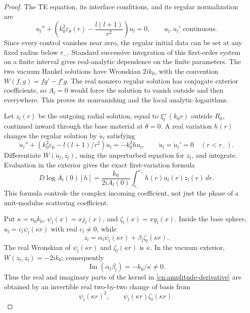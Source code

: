 \begin{proof}
The TE equation, its interface conditions, and its regular normalization
are
\begin{equation}\label{cn:controlled-ode}
 u_l''+\left(k_0^2\varepsilon_\theta(r)
                 -\frac{l(l+1)}{r^2}\right)u_l=0,
 \qquad u_l,u_l'\text{ continuous}.
\end{equation}
Since every control vanishes near zero, the regular initial data can be
set at any fixed radius below $r_-$.  Standard successive integration
of this first-order system on a finite interval gives real-analytic
dependence on the finite parameters.  The two vacuum Hankel solutions
have Wronskian $2ik_0$, with the convention
$W(f,g)=fg'-f'g$.  The real nonzero regular solution has conjugate
exterior coefficients, so $A_l=0$ would force the solution to vanish
outside and then everywhere.  This proves its nonvanishing and the
local analytic logarithms.

Let $z_l(r)$ be the outgoing radial solution, equal to
$\xi_l^+(k_0r)$ outside $R_0$, continued inward through the base
material at $\theta=0$.  A real variation $h(r)$ changes the regular
solution by $\dot u_l$ satisfying
\begin{equation}\label{cn:variation-ode}
 \dot u_l''+\left(k_0^2\varepsilon_0-l(l+1)/r^2\right)\dot u_l
       =-k_0^2h u_l,
 \qquad \dot u_l=\dot u_l'=0\quad(r<r_-).
\end{equation}
Differentiate $W(\dot u_l,z_l)$, using the unperturbed equation for
$z_l$, and integrate.  Evaluation in the exterior gives the exact
first-variation formula
\begin{equation}\label{cn:amplitude-derivative}
 D\log A_l(0)[h]
   =\frac{k_0}{2iA_l(0)}\int_{r_-}^{r_+}
                    h(r)u_l(r)z_l(r)\,dr.
\end{equation}
This formula controls the complex incoming coefficient, not just the
phase of a unit-modulus scattering coefficient.

Put $\kappa=n_bk_0$, $\psi_l(x)=xj_l(x)$, and
$\zeta_l(x)=xy_l(x)$.  Inside the base sphere,
$u_l=c_l\psi_l(\kappa r)$ with real $c_l\ne0$, while
\begin{equation}\label{cn:outgoing-interior}
 z_l=\alpha_l\psi_l(\kappa r)+\beta_l\zeta_l(\kappa r).
\end{equation}
The real Wronskian of $\psi_l(\kappa r)$ and
$\zeta_l(\kappa r)$ is $\kappa$.  In the vacuum exterior,
$W(z_l,\overline{z_l})=-2ik_0$; consequently
\begin{equation}\label{cn:independent-coefficients}
 \operatorname{Im}(\alpha_l\overline{\beta_l})
       =-k_0/\kappa\ne0.
\end{equation}
Thus the real and imaginary parts of the kernel in
\eqref{cn:amplitude-derivative} are obtained by an invertible real
two-by-two change of basis from
\begin{equation}\label{cn:product-kernels}
 \psi_l(\kappa r)^2,\qquad
 \psi_l(\kappa r)\zeta_l(\kappa r).
\end{equation}


\end{proof}
